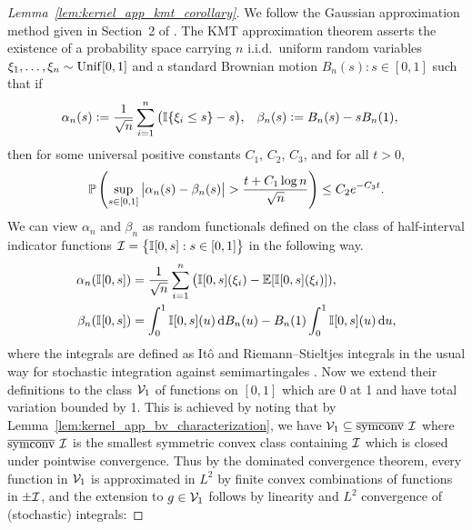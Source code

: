 \begin{proof}[Lemma~\ref{lem:kernel_app_kmt_corollary}]

  We follow the Gaussian approximation method given in
  Section~2 of \citet{gine2004kernel}.
  The KMT approximation theorem \citep{komlos1975approximation}
  asserts the existence
  of a probability space
  carrying $n$ i.i.d.\ uniform random variables
  $\xi_1, \ldots, \xi_n \sim \Unif[0,1]$
  and a standard Brownian motion
  $B_n(s): s \in [0,1]$
  such that if
  \begin{align*}
    \alpha_n(s)
    &\vcentcolon=
    \frac{1}{\sqrt{n}}
    \sum_{i=1}^n
    \big(
      \I\{\xi_i \leq s\} - s
    \big),
    &\beta_n(s)
    &\vcentcolon=
    B_n(s) - s B_n(1),
  \end{align*}
  then
  for some universal positive constants
  $C_1$, $C_2$, $C_3$,
  and for all $t > 0$,
  \begin{align*}
    \P\left(
      \sup_{s \in [0,1]}
      \big| \alpha_n(s) - \beta_n(s) \big|
      > \frac{t + C_1\log n}{\sqrt{n}}
    \right)
    \leq C_2 e^{-C_3 t}.
  \end{align*}
  We can
  view $\alpha_n$ and $\beta_n$ as random functionals
  defined on the class of
  half-interval indicator functions
  $\cI = \big\{\I[0,s]: s \in [0,1]\big\}$
  in the following way.
  \begin{align*}
    \alpha_n(\I[0,s])
    &= \frac{1}{\sqrt{n}}
    \sum_{i=1}^n
    \big( \I[0,s](\xi_i) - \E[\I[0,s](\xi_i)]), \\
    \beta_n(\I[0,s])
    &= \int_0^1 \I[0,s](u) \diff{B_n(u)}
    - B_n(1) \int_0^1 \I[0,s](u) \diff{u},
  \end{align*}
  where the integrals are defined as It{\^o} and
  Riemann--Stieltjes integrals in
  the usual way for stochastic integration against semimartingales
  \citep[Chapter~5]{legall2016brownian}.
  Now we extend their definitions to the class
  $\cV_1$
  of functions on $[0,1]$
  which are 0 at 1 and have total variation bounded by 1.
  This is achieved by
  noting that by Lemma~\ref{lem:kernel_app_bv_characterization},
  we have
  $\cV_1 \subseteq \overline\symconv \ \cI$
  where $\overline{\symconv} \ \cI$ is the
  smallest
  symmetric convex class containing $\cI$
  which is closed under pointwise convergence.
  Thus by the dominated convergence theorem,
  every function in $\cV_1$ is approximated in $L^2$ by finite convex
  combinations of functions in $\pm\cI$,
  and the extension to $g \in \cV_1$ follows
  by linearity and $L^2$ convergence of (stochastic) integrals:

\end{proof}
